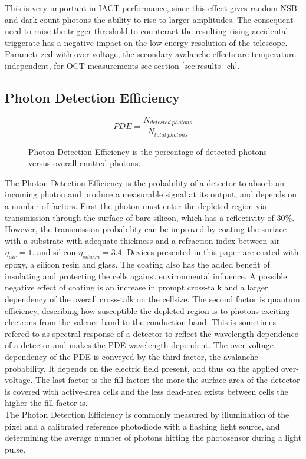 \documentclass[12pt,article,type=msc,colorback,accentcolor=tud9c]{tudthesis}
\begin{document}
This is very important in IACT performance, since this effect gives random NSB and dark count photons the ability to rise to larger amplitudes. The consequent need to raise the trigger threshold to counteract the resulting rising accidental-triggerate has a negative impact on the low energy resolution of the telescope.\\

Parametrized with over-voltage, the secondary avalanche effects are temperature independent, for OCT measurements see section {\ref{sec:results_ch}}.




\subsection{Photon Detection Efficiency}
\label{subsec:SiPMPDE}
\begin{figure}[h]
\begin{equation}
PDE = \frac{N_{detected\:photons}}{N_{total\:photons}}
\end{equation}
\label{PDE_eq}
\caption{Photon Detection Efficiency is the percentage of detected photons versus overall emitted photons. }
\end{figure}
The Photon Detection Efficiency is the probability of a detector to absorb an incoming photon and produce a measurable signal at its output, and depends on a number of factors. First the photon must enter the depleted region via transmission through the surface of bare silicon, which has a reflectivity of 30$\%$. However, the transmission probability can be improved by coating the surface with a substrate with adequate thickness and a refraction index between air $\eta_{air} = 1.$ and silicon $\eta_{silicon} = 3.4$. Devices presented in this paper are coated with epoxy, a silicon resin and glass. The coating also has the added benefit of insulating and protecting the cells against environmental influence. A possible negative effect of coating is an increase in prompt cross-talk and a larger dependency of the overall cross-talk on the cellsize. The second factor is quantum efficiency, describing how susceptible the depleted region is to photons exciting electrons from the valence band to the conduction band. This is sometimes refered to as spectral response of a detector to reflect the wavelength dependence of a detector and makes the PDE wavelength dependent. The over-voltage dependency of the PDE is conveyed by the third factor, the avalanche probability. It depends on the electric field present, and thus on the applied over-voltage. The last factor is the fill-factor: the more the surface area of the detector is covered with active-area cells and the less dead-area exists between cells the higher the fill-factor is. \\
The Photon Detection Efficiency is commonly measured by illumination of the pixel and a calibrated reference photodiode with a flashing light source, and determining the average number of photons hitting the photosensor during a light pulse.
\end{document}
